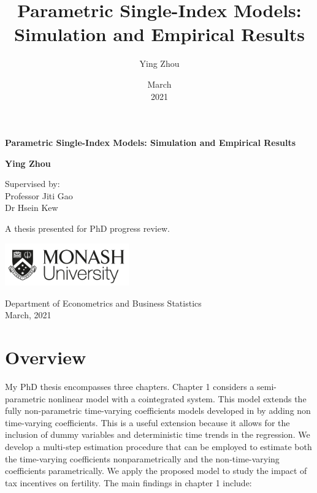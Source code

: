 \documentclass[a4paper,12pt,times,numbered,print,index]{report}
\title{{Parametric Single-Index Models: Simulation and Empirical Results} \vspace{2cm}}
\author{Ying Zhou}
\date{March \\ 2021}
\numberwithin{equation}{section}
\begin{document}
	
	\begin{titlepage}
		\begin{center}
			\vspace*{1cm}
			
			\Huge
			\textbf{Parametric Single-Index Models: Simulation and Empirical Results}
			
			\vspace{2.5cm}
			
			\large
			\textbf{Ying Zhou} \\
			
			\vspace{0.5cm}
			
			Supervised by: \\
			Professor Jiti Gao \\
			Dr Hsein Kew
			
			\vfill
			
			A thesis presented for PhD progress review.
			
			\vspace{0.8cm}
			
			\includegraphics[width=0.4\textwidth]{monash-university-logo.png}
			
			Department of Econometrics and Business Statistics \\
			
			March,  2021
			
		\end{center}
	\end{titlepage}
	
	
	\section{Overview}
	
	
	My PhD thesis encompasses three chapters. Chapter 1 considers a
	semi-parametric nonlinear model with a cointegrated system. This model
	extends the fully non-parametric time-varying coefficients models developed
	in \cite{li2016estimation}  by adding non time-varying
	coefficients. This is a useful extension because it allows for the inclusion
	of dummy variables and deterministic time trends in the regression. We
	develop a multi-step estimation procedure that can be employed to estimate
	both the time-varying coefficients nonparametrically and the
	non-time-varying coefficients parametrically. We apply the proposed model to
	study the impact of tax incentives on fertility. The main findings in chapter 1 include:
	
\end{document}
